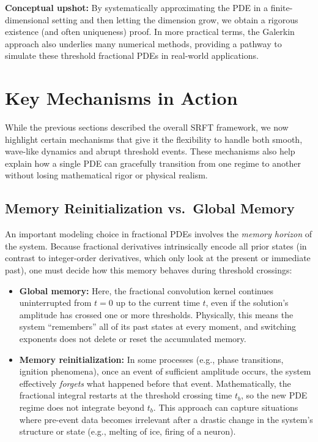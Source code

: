 \documentclass[12pt]{article}
\begin{document}
\noindent
\textbf{Conceptual upshot:} By systematically approximating the PDE in a
finite-dimensional setting and then letting the dimension grow, we obtain a rigorous
existence (and often uniqueness) proof. In more practical terms, the Galerkin approach
also underlies many numerical methods, providing a pathway to simulate these threshold
fractional PDEs in real-world applications.

\section{Key Mechanisms in Action}
\label{sec:key_mechanisms}

While the previous sections described the overall SRFT framework, we now highlight
certain mechanisms that give it the flexibility to handle both smooth, wave-like
dynamics and abrupt threshold events. These mechanisms also help explain how
a single PDE can gracefully transition from one regime to another without losing
mathematical rigor or physical realism.

\subsection{Memory Reinitialization vs.\ Global Memory}
\label{subsec:memory_choice}

An important modeling choice in fractional PDEs involves the \emph{memory horizon}
of the system. Because fractional derivatives intrinsically encode all prior states
(in contrast to integer-order derivatives, which only look at the present or immediate
past), one must decide how this memory behaves during threshold crossings:
\begin{itemize}
    \item \textbf{Global memory:} 
    Here, the fractional convolution kernel continues uninterrupted from $t=0$ up
    to the current time $t$, even if the solution’s amplitude has crossed one or
    more thresholds. Physically, this means the system “remembers” all of its past
    states at every moment, and switching exponents does not delete or reset the
    accumulated memory.
    \item \textbf{Memory reinitialization:}
    In some processes (e.g., phase transitions, ignition phenomena), once an event
    of sufficient amplitude occurs, the system effectively \emph{forgets} what
    happened before that event. Mathematically, the fractional integral restarts at
    the threshold crossing time $t_b$, so the new PDE regime does not integrate
    beyond $t_b$. This approach can capture situations where pre-event data
    becomes irrelevant after a drastic change in the system’s structure or
    state (e.g., melting of ice, firing of a neuron).
\end{itemize}
\end{document}
